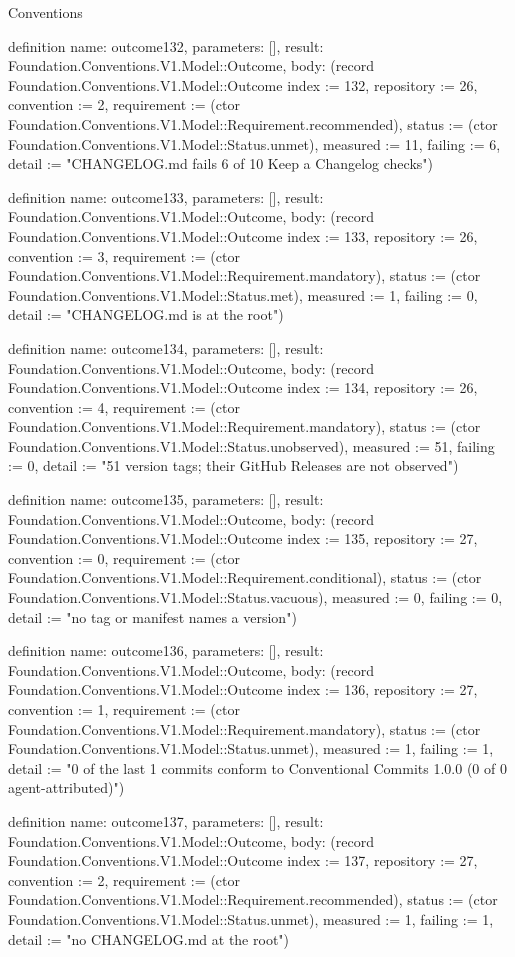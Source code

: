 \begin{lexlean}{Conventions}
\begin{semanticmodule}
definition{
  name: outcome132,
  parameters: [],
  result: Foundation.Conventions.V1.Model::Outcome,
  body: (record Foundation.Conventions.V1.Model::Outcome {index := 132, repository := 26, convention := 2, requirement := (ctor Foundation.Conventions.V1.Model::Requirement.recommended), status := (ctor Foundation.Conventions.V1.Model::Status.unmet), measured := 11, failing := 6, detail := "CHANGELOG.md fails 6 of 10 Keep a Changelog checks"})
}

definition{
  name: outcome133,
  parameters: [],
  result: Foundation.Conventions.V1.Model::Outcome,
  body: (record Foundation.Conventions.V1.Model::Outcome {index := 133, repository := 26, convention := 3, requirement := (ctor Foundation.Conventions.V1.Model::Requirement.mandatory), status := (ctor Foundation.Conventions.V1.Model::Status.met), measured := 1, failing := 0, detail := "CHANGELOG.md is at the root"})
}

definition{
  name: outcome134,
  parameters: [],
  result: Foundation.Conventions.V1.Model::Outcome,
  body: (record Foundation.Conventions.V1.Model::Outcome {index := 134, repository := 26, convention := 4, requirement := (ctor Foundation.Conventions.V1.Model::Requirement.mandatory), status := (ctor Foundation.Conventions.V1.Model::Status.unobserved), measured := 51, failing := 0, detail := "51 version tags; their GitHub Releases are not observed"})
}

definition{
  name: outcome135,
  parameters: [],
  result: Foundation.Conventions.V1.Model::Outcome,
  body: (record Foundation.Conventions.V1.Model::Outcome {index := 135, repository := 27, convention := 0, requirement := (ctor Foundation.Conventions.V1.Model::Requirement.conditional), status := (ctor Foundation.Conventions.V1.Model::Status.vacuous), measured := 0, failing := 0, detail := "no tag or manifest names a version"})
}

definition{
  name: outcome136,
  parameters: [],
  result: Foundation.Conventions.V1.Model::Outcome,
  body: (record Foundation.Conventions.V1.Model::Outcome {index := 136, repository := 27, convention := 1, requirement := (ctor Foundation.Conventions.V1.Model::Requirement.mandatory), status := (ctor Foundation.Conventions.V1.Model::Status.unmet), measured := 1, failing := 1, detail := "0 of the last 1 commits conform to Conventional Commits 1.0.0 (0 of 0 agent-attributed)"})
}

definition{
  name: outcome137,
  parameters: [],
  result: Foundation.Conventions.V1.Model::Outcome,
  body: (record Foundation.Conventions.V1.Model::Outcome {index := 137, repository := 27, convention := 2, requirement := (ctor Foundation.Conventions.V1.Model::Requirement.recommended), status := (ctor Foundation.Conventions.V1.Model::Status.unmet), measured := 1, failing := 1, detail := "no CHANGELOG.md at the root"})
}


\end{semanticmodule}
\end{lexlean}
